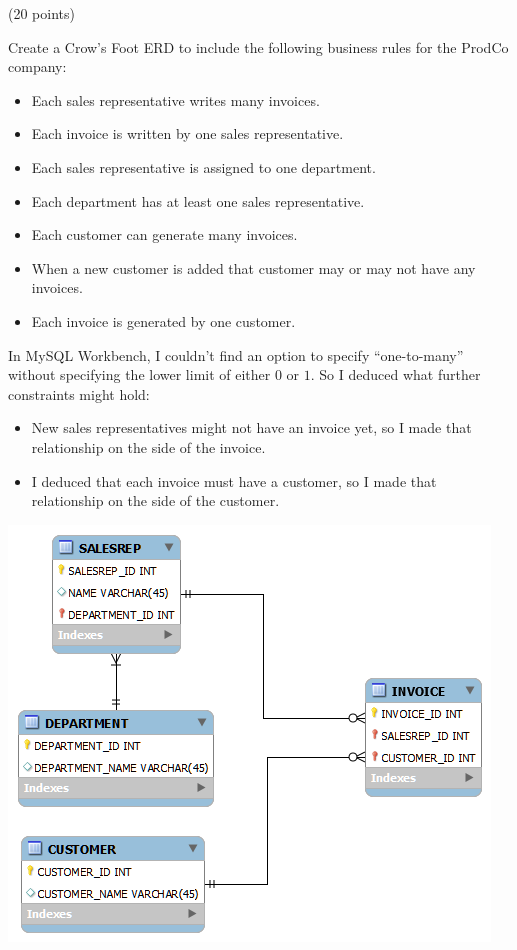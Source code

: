 \begin{problem} (20 points)
  
  \noindent
  Create a Crow’s Foot ERD to include the following business rules for the ProdCo company:
    \begin{itemize}
      \item Each sales representative writes many invoices.
      \item Each invoice is written by one sales representative.
      \item Each sales representative is assigned to one department.
      \item Each department has at least one sales representative.
      \item Each customer can generate many invoices.
      \item When a new customer is added that customer may or may not have any invoices.
      \item Each invoice is generated by one customer.
    \end{itemize}
\end{problem}
\begin{Answer}
  In MySQL Workbench, I couldn't find an option
  to specify ``one-to-many'' without specifying the lower
  limit of either $0$ or $1$.
  So I deduced what further constraints might hold:
  
  \begin{itemize}
    \item New sales representatives might not have an invoice yet, so
    I made that relationship  on the side of the invoice.
    \item I deduced that each invoice must have a customer, so I made
    that relationship  on the side of the customer.
  \end{itemize}
  \bigskip
  \centering
  \includegraphics[scale=0.8]{erd.png}
\end{Answer}

